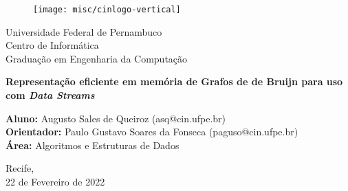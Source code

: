 \begin{figure}[!htpb]
	\centering
	\texttt{[image: misc/cinlogo-vertical]}
\end{figure}

\vspace{1cm}
\begin{center}
	{Universidade Federal de Pernambuco\\
	Centro de Informática\\
	Graduação em Engenharia da Computação}
\end{center}
\vspace{2cm}
\begin{center}
	\large{\textbf{Representação eficiente em memória de Grafos de de Bruijn para uso com \emph{Data Streams}}}
\end{center}
\vspace{2.5cm}

\begin{center}
    \textbf{Aluno:} Augusto Sales de Queiroz (asq@cin.ufpe.br) \\
    \leavevmode \newline
    \textbf{Orientador:} Paulo Gustavo Soares da Fonseca (paguso@cin.ufpe.br) \\
    \leavevmode \newline
    \textbf{Área:} Algoritmos e Estruturas de Dados \\
\end{center}

\vspace{4cm}
\begin{center}
    Recife,\\
    22 de Fevereiro de 2022
\end{center}

\thispagestyle{empty}